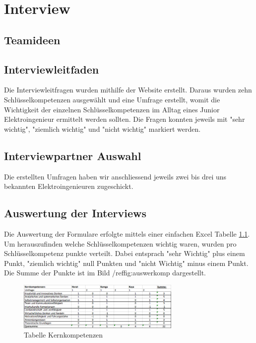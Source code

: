 
\chapter{Interview}

\section{Teamideen}

\section{Interviewleitfaden}

Die Interviewleitfragen wurden mithilfe der Website \cite{Schluesselqualifikationen} erstellt. Daraus wurden zehn Schlüsselkompetenzen ausgewählt und eine Umfrage erstellt, womit die Wichtigkeit der einzelnen Schlüsselkompetenzen im Alltag eines Junior Elektroingenieur ermittelt werden sollten. Die Fragen konnten jeweils mit "sehr wichtig", "ziemlich wichtig" und "nicht wichtig" markiert werden.   


\section{Interviewpartner Auswahl}

Die erstellten Umfragen haben wir anschliessend jeweils zwei bis drei uns bekannten Elektroingenieuren zugeschickt. 

\section{Auswertung der Interviews}

Die Auswertung der Formulare erfolgte mittels einer einfachen Excel Tabelle \ref{fig:tabkernkomp}. Um herauszufinden welche Schlüsselkompetenzen wichtig waren, wurden pro Schlüsselkompetenz punkte verteilt. Dabei entsprach "sehr Wichtig" plus einem Punkt, "ziemlich wichtig" null Punkten und "nicht Wichtig" minus einem Punkt. Die Summe der Punkte ist im Bild /ref{fig:auswerkomp} dargestellt. 

\begin{figure}[ht]
	\centering
	\includegraphics[width=0.7\textwidth]{images/Tabelle_Kernkompetenzen.png}
	\caption{Tabelle Kernkompetenzen}
	\label{fig:tabkernkomp}
\end{figure}

